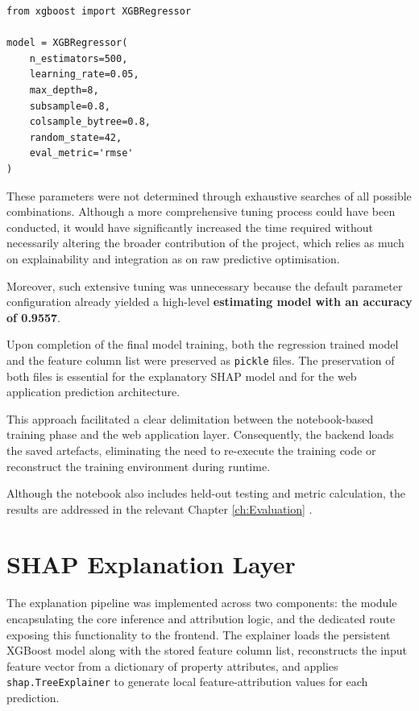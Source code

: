 \begin{verbatim}
from xgboost import XGBRegressor

model = XGBRegressor(
    n_estimators=500,
    learning_rate=0.05,
    max_depth=8,
    subsample=0.8,
    colsample_bytree=0.8,
    random_state=42,
    eval_metric='rmse'
)
\end{verbatim}

These parameters were not determined through exhaustive searches of all possible combinations. Although a more comprehensive tuning process could have been conducted, it would have significantly increased the time required without necessarily altering the broader contribution of the project, which relies as much on explainability and integration as on raw predictive optimisation. 

Moreover, such extensive tuning was unnecessary because the default parameter configuration already yielded a high-level \textbf{estimating model with an accuracy of 0.9557}.

Upon completion of the final model training, both the regression trained model and the feature column list were preserved as \verb|pickle| files. The preservation of both files is essential for the explanatory SHAP model and for the web application prediction architecture.

This approach facilitated a clear delimitation between the notebook-based training phase and the web application layer. Consequently, the backend loads the saved artefacts, eliminating the need to re-execute the training code or reconstruct the training environment during runtime.

Although the notebook also includes held-out testing and metric calculation, the results are addressed in the relevant Chapter \ref{ch:Evaluation} .

\section{SHAP Explanation Layer}
\label{se:SHAPExplanationLayer}

The explanation pipeline was implemented across two components: the module encapsulating the core 
inference and attribution logic, and the dedicated route exposing this functionality to the frontend. 
The explainer loads the persistent XGBoost model along with the stored feature column list, reconstructs the input feature vector from a dictionary of property attributes, and applies \verb|shap.TreeExplainer|\parencite{shap2026} to generate local feature-attribution values for each prediction.

